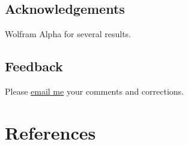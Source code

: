 \documentclass[
  a4paper,
]{article}
\begin{document}
\subsection{Acknowledgements}\label{acknowledgements}

Wolfram Alpha for several results.

\subsection{Feedback}\label{feedback}

Please \href{mailto:feedback.swanlotus@gmail.com}{email me} your
comments and corrections.

\section*{References}\label{bibliography}
\end{document}
